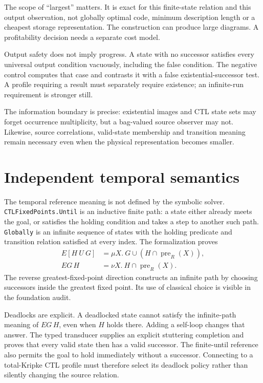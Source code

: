 \documentclass[11pt,a4paper]{article}
\newcommand{\code}[1]{\nolinkurl{#1}}
\begin{document}
The scope of ``largest'' matters. It is exact for this finite-state relation
and this output observation, not globally optimal code, minimum description
length or a cheapest storage representation. The construction can produce
large diagrams. A profitability decision needs a separate cost model.

Output safety does not imply progress. A state with no successor satisfies
every universal output condition vacuously, including the false condition.
The negative control computes that case and contrasts it with a false
existential-successor test. A profile requiring a result must separately
require existence; an infinite-run requirement is stronger still.

The information boundary is precise: existential images and CTL state sets
may forget occurrence multiplicity, but a bag-valued source observer may not.
Likewise, source correlations, valid-state membership and transition meaning
remain necessary even when the physical representation becomes smaller.

\section{Independent temporal semantics}

The temporal reference meaning is not defined by the symbolic solver.
\code{CTLFixedPoints.Until} is an inductive finite path: a state either
already meets the goal, or satisfies the holding condition and takes a step
to another such path. \code{Globally} is an infinite sequence of states with
the holding predicate and transition relation satisfied at every index.
The formalization proves
\begin{align*}
 E[H\ U\ G]&=\mu X.\ G\cup(H\cap\operatorname{pre}_R(X)),\\
 EG\,H&=\nu X.\ H\cap\operatorname{pre}_R(X).
\end{align*}
The reverse greatest-fixed-point direction constructs an infinite path by
choosing successors inside the greatest fixed point. Its use of classical
choice is visible in the foundation audit.

Deadlocks are explicit. A deadlocked state cannot satisfy the infinite-path
meaning of $EG\,H$, even when $H$ holds there. Adding a self-loop changes that
answer. The typed transducer supplies an explicit stuttering completion and
proves that every valid state then has a valid successor. The finite-until
reference also permits the goal to hold immediately without a successor.
Connecting to a total-Kripke CTL profile must therefore select its deadlock
policy rather than silently changing the source relation.
\end{document}
